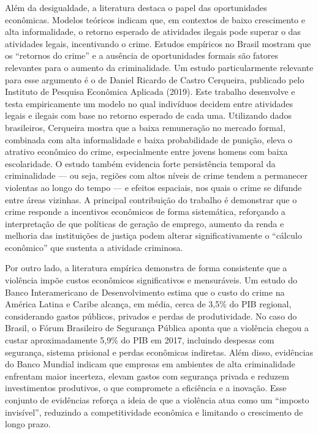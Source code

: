 \documentclass[11pt,a4paper]{article}
\begin{document}
Além da desigualdade, a literatura destaca o papel das oportunidades econômicas. Modelos teóricos
indicam que, em contextos de baixo crescimento e alta informalidade, o retorno esperado de
atividades ilegais pode superar o das atividades legais, incentivando o crime. Estudos empíricos no
Brasil mostram que os ``retornos do crime'' e a ausência de oportunidades formais são fatores
relevantes para o aumento da criminalidade. Um estudo particularmente relevante para esse argumento
é o de Daniel Ricardo de Castro Cerqueira, publicado pelo Instituto de Pesquisa Econômica Aplicada
(2019). Este trabalho desenvolve e testa empiricamente um modelo no qual indivíduos decidem entre
atividades legais e ilegais com base no retorno esperado de cada uma. Utilizando dados brasileiros,
Cerqueira mostra que a baixa remuneração no mercado formal, combinada com alta informalidade e baixa
probabilidade de punição, eleva o atrativo econômico do crime, especialmente entre jovens homens com
baixa escolaridade. O estudo também evidencia forte persistência temporal da criminalidade --- ou
seja, regiões com altos níveis de crime tendem a permanecer violentas ao longo do tempo --- e
efeitos espaciais, nos quais o crime se difunde entre áreas vizinhas. A principal contribuição do
trabalho é demonstrar que o crime responde a incentivos econômicos de forma sistemática, reforçando
a interpretação de que políticas de geração de emprego, aumento da renda e melhoria das instituições
de justiça podem alterar significativamente o ``cálculo econômico'' que sustenta a atividade
criminosa.

Por outro lado, a literatura empírica demonstra de forma consistente que a violência impõe custos
econômicos significativos e mensuráveis. Um estudo do Banco Interamericano de Desenvolvimento estima
que o custo do crime na América Latina e Caribe alcança, em média, cerca de 3,5\% do PIB regional,
considerando gastos públicos, privados e perdas de produtividade. No caso do Brasil, o Fórum
Brasileiro de Segurança Pública aponta que a violência chegou a custar aproximadamente 5,9\% do PIB
em 2017, incluindo despesas com segurança, sistema prisional e perdas econômicas indiretas. Além
disso, evidências do Banco Mundial indicam que empresas em ambientes de alta criminalidade enfrentam
maior incerteza, elevam gastos com segurança privada e reduzem investimentos produtivos, o que
compromete a eficiência e a inovação. Esse conjunto de evidências reforça a ideia de que a violência
atua como um ``imposto invisível'', reduzindo a competitividade econômica e limitando o crescimento
de longo prazo.
\end{document}
